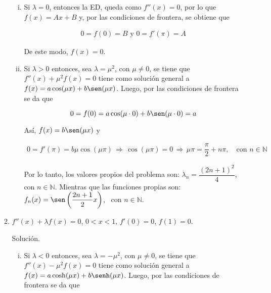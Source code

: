 \documentclass[fleqn]{article}
\newcommand{\nat}{\mathbb{N}}
\begin{document}
\begin{enumerate}[I.]
\begin{enumerate}
\begin{enumerate}[i)]
				\item Si $ \lambda = 0 $, entonces la ED, queda como $ f''(x) = 0 $, por lo que $ f(x) = Ax + B $ y, por las condiciones de frontera, se obtiene que 
				
				\begin{align*}
					0 = f(0) = B \mbox{ y } 0 = f'(\pi) = A
				\end{align*}

				De este modo, $ f(x) = 0 $.
				
				\item Si $ \lambda > 0 $ entonces, sea $ \lambda = \mu^2 $, con $ \mu \neq 0 $, se tiene que $ f''(x) + \mu^2 f(x) = 0 $
				tiene como solución general a $ f(x) = a \cos(\mu x) + b \sen(\mu x) $. Luego, por las condiciones de frontera se da que
				
				\begin{equation*}
					0 = f(0) = a \cos(\mu \cdot 0) + b \sen(\mu \cdot 0) = a
				\end{equation*}

				Así, $ f(x) = b \sen(\mu x) $ y 

				\begin{align*}
					0 = f'(\pi) = b \mu \cos(\mu \pi) \, \Longrightarrow \, \cos(\mu \pi) = 0 \, \Longrightarrow \, \mu \pi = \dfrac{\pi}{2} + n \pi, \quad \mbox{con } n \in \nat
				\end{align*}
				
				Por lo tanto, los valores propios del problema son: $ \lambda_n = \dfrac{(2n + 1)^2}{4} $, \, con $ n \in \nat $. Mientras que las funciones propias son: $ f_n (x) = \sen \left( \dfrac{2n + 1}{2} x \right) $, \, con $ n \in \nat $.
			\end{enumerate} \vspace{3mm}


			\bfseries
			
			\item $ f''(x) + \lambda f(x) = 0 $, $ 0 < x < 1 $, $ f'(0) = 0 $, $ f(1) = 0 $.
			
			Solución.
			
			\normalfont

			\begin{enumerate}[i)]
				\item Si $ \lambda < 0 $ entonces, sea $ \lambda = - \mu^2 $, con $ \mu \neq 0 $, se tiene que $ f''(x) - \mu^2 f(x) = 0 $
				tiene como solución general a $ f(x) = a \cosh(\mu x) + b \senh(\mu x) $. Luego, por las condiciones de frontera se da que
				

\end{enumerate}
\end{enumerate}
\end{enumerate}
\end{document}

